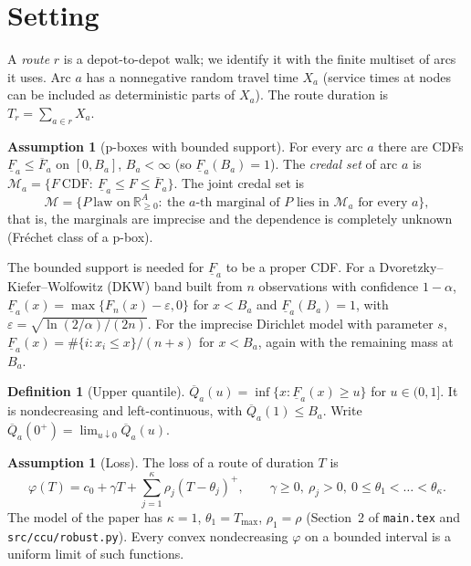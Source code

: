 \documentclass[11pt]{article}
\theoremstyle{definition}
\newtheorem{definition}[theorem]{Definition}
\newtheorem{assumption}[theorem]{Assumption}
\newcommand{\R}{\mathbb{R}}
\newcommand{\Qb}{\overline{Q}}
\newcommand{\Fl}{\underline{F}}
\newcommand{\Fu}{\overline{F}}
\newcommand{\cM}{\mathcal{M}}
\newcommand{\pos}[1]{\left(#1\right)^{+}}
\begin{document}
\tableofcontents

\section{Setting}\label{sec:setting}

A \emph{route} $r$ is a depot-to-depot walk; we identify it with the finite multiset of arcs it uses. Arc $a$ has a nonnegative random travel time $X_a$ (service times at nodes can be included as deterministic parts of $X_a$). The route duration is $T_r=\sum_{a\in r}X_a$.

\begin{assumption}[p-boxes with bounded support]\label{ass:pbox}
For every arc $a$ there are CDFs $\Fl_a\le\Fu_a$ on $[0,B_a]$, $B_a<\infty$ (so $\Fl_a(B_a)=1$). The \emph{credal set} of arc $a$ is $\cM_a=\{F\ \text{CDF}:\ \Fl_a\le F\le\Fu_a\}$. The joint credal set is
\[
\cM=\{P\ \text{law on}\ \R_{\ge0}^{A}:\ \text{the $a$-th marginal of $P$ lies in $\cM_a$ for every $a$}\},
\]
that is, the marginals are imprecise and the dependence is completely unknown (Fr\'echet class of a p-box).
\end{assumption}

The bounded support is needed for $\Fl_a$ to be a proper CDF. For a Dvoretzky--Kiefer--Wolfowitz (DKW) band built from $n$ observations with confidence $1-\alpha$, $\Fl_a(x)=\max\{F_n(x)-\varepsilon,0\}$ for $x<B_a$ and $\Fl_a(B_a)=1$, with $\varepsilon=\sqrt{\ln(2/\alpha)/(2n)}$. For the imprecise Dirichlet model with parameter $s$, $\Fl_a(x)=\#\{i:x_i\le x\}/(n+s)$ for $x<B_a$, again with the remaining mass at $B_a$.

\begin{definition}[Upper quantile]
$\Qb_a(u)=\inf\{x:\Fl_a(x)\ge u\}$ for $u\in(0,1]$. It is nondecreasing and left-continuous, with $\Qb_a(1)\le B_a$. Write $\Qb_a(0^+)=\lim_{u\downarrow0}\Qb_a(u)$.
\end{definition}

\begin{assumption}[Loss]\label{ass:loss}
The loss of a route of duration $T$ is
\[
\varphi(T)=c_0+\gamma T+\sum_{j=1}^{\kappa}\rho_j\pos{T-\theta_j},\qquad \gamma\ge0,\ \rho_j>0,\ 0\le\theta_1<\dots<\theta_\kappa .
\]
The model of the paper has $\kappa=1$, $\theta_1=T_{\max}$, $\rho_1=\rho$ (Section~2 of \texttt{main.tex} and \texttt{src/ccu/robust.py}). Every convex nondecreasing $\varphi$ on a bounded interval is a uniform limit of such functions.
\end{assumption}
\end{document}
